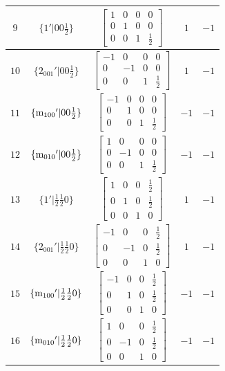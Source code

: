 \documentclass[fleqn,8pt]{jsarticle}
\begin{document}
\begin{longtable}{ccccc}
$ 9 $ & $ \{1{}'|0 0 \frac{1}{2}\} $ & $ \begin{bmatrix} 1 & 0 & 0 & 0 \\ 0 & 1 & 0 & 0 \\ 0 & 0 & 1 & \frac{1}{2} \end{bmatrix} $ & $ 1 $ & $ -1 $ \\ \hline
$ 10 $ & $ \{2{}_{001}{}'|0 0 \frac{1}{2}\} $ & $ \begin{bmatrix} -1 & 0 & 0 & 0 \\ 0 & -1 & 0 & 0 \\ 0 & 0 & 1 & \frac{1}{2} \end{bmatrix} $ & $ 1 $ & $ -1 $ \\ \hline
$ 11 $ & $ \{{\rm m}_{100}{}'|0 0 \frac{1}{2}\} $ & $ \begin{bmatrix} -1 & 0 & 0 & 0 \\ 0 & 1 & 0 & 0 \\ 0 & 0 & 1 & \frac{1}{2} \end{bmatrix} $ & $ -1 $ & $ -1 $ \\ \hline
$ 12 $ & $ \{{\rm m}_{010}{}'|0 0 \frac{1}{2}\} $ & $ \begin{bmatrix} 1 & 0 & 0 & 0 \\ 0 & -1 & 0 & 0 \\ 0 & 0 & 1 & \frac{1}{2} \end{bmatrix} $ & $ -1 $ & $ -1 $ \\ \hline
$ 13 $ & $ \{1{}'|\frac{1}{2} \frac{1}{2} 0\} $ & $ \begin{bmatrix} 1 & 0 & 0 & \frac{1}{2} \\ 0 & 1 & 0 & \frac{1}{2} \\ 0 & 0 & 1 & 0 \end{bmatrix} $ & $ 1 $ & $ -1 $ \\ \hline
$ 14 $ & $ \{2{}_{001}{}'|\frac{1}{2} \frac{1}{2} 0\} $ & $ \begin{bmatrix} -1 & 0 & 0 & \frac{1}{2} \\ 0 & -1 & 0 & \frac{1}{2} \\ 0 & 0 & 1 & 0 \end{bmatrix} $ & $ 1 $ & $ -1 $ \\ \hline
$ 15 $ & $ \{{\rm m}_{100}{}'|\frac{1}{2} \frac{1}{2} 0\} $ & $ \begin{bmatrix} -1 & 0 & 0 & \frac{1}{2} \\ 0 & 1 & 0 & \frac{1}{2} \\ 0 & 0 & 1 & 0 \end{bmatrix} $ & $ -1 $ & $ -1 $ \\ \hline
$ 16 $ & $ \{{\rm m}_{010}{}'|\frac{1}{2} \frac{1}{2} 0\} $ & $ \begin{bmatrix} 1 & 0 & 0 & \frac{1}{2} \\ 0 & -1 & 0 & \frac{1}{2} \\ 0 & 0 & 1 & 0 \end{bmatrix} $ & $ -1 $ & $ -1 $ \\
\end{longtable}
\end{document}
